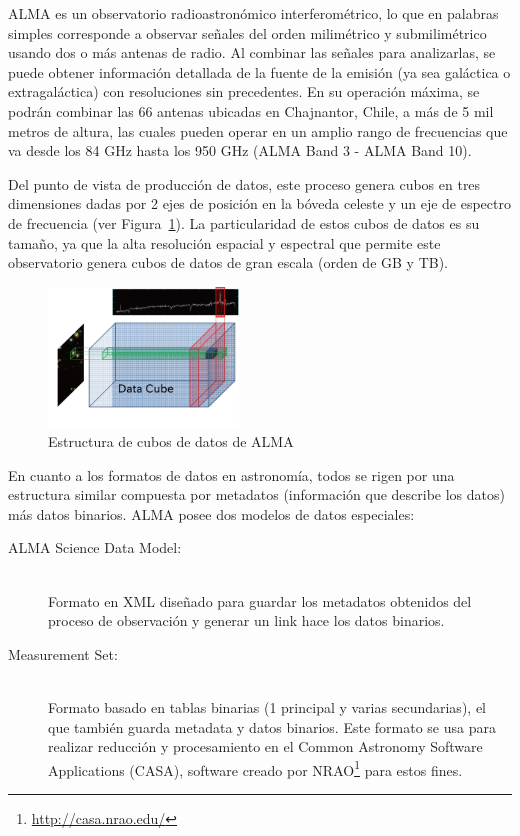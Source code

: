ALMA es un observatorio radioastronómico interferométrico, 
lo que en palabras simples corresponde a observar señales del orden 
milimétrico y submilimétrico usando dos o más antenas de radio. Al combinar las señales 
para analizarlas, se puede obtener información detallada de la fuente de la emisión 
(ya sea galáctica o extragaláctica) con resoluciones sin precedentes.
En su operación máxima, se podrán combinar las 66 antenas ubicadas en Chajnantor,
Chile, a más de 5 mil metros de altura, las cuales pueden operar en un amplio rango 
de frecuencias que va desde los 84 GHz hasta los 950 GHz (ALMA Band 3 - ALMA Band 10). 

Del punto de vista de producción de datos, este proceso genera cubos en tres
dimensiones dadas por 2 ejes de posición en la bóveda celeste y un eje de
espectro de frecuencia (ver Figura~\ref{fig:cube}). La particularidad de estos 
cubos de datos es su tamaño, ya que la alta resolución espacial y espectral que
permite este observatorio genera cubos de datos de gran escala (orden de GB y TB).

\begin{figure}[ht]
    \centering
    \includegraphics[width=0.45\textwidth]{images/cube.png}
    \caption{Estructura de cubos de datos de ALMA \cite{dent20132}}
    \label{fig:cube}
\end{figure}

En cuanto a los formatos de datos en astronomía, todos se rigen por una estructura
similar compuesta por metadatos (información que describe los datos) más datos
binarios. ALMA posee dos modelos de datos especiales:
\begin{description}
    \item[ALMA Science Data Model:] \hfill \\
        Formato en XML diseñado para guardar los metadatos obtenidos del
        proceso de observación y generar un link hace los datos binarios.
    \item[Measurement Set:] \hfill \\
        Formato basado en tablas binarias (1 principal y varias secundarias),
        el que también guarda metadata y datos binarios. Este formato se usa
        para realizar reducción y procesamiento en el 
        Common Astronomy Software Applications (CASA), 
        software creado por NRAO\footnote{\url{http://casa.nrao.edu/}} para estos fines.
\end{description}

